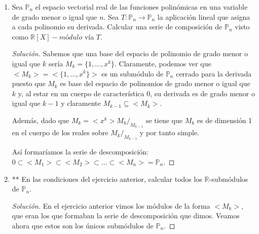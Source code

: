 \documentclass[paper=a4, fontsize=11pt, spanish]{scrartcl}
\begin{document}
\begin{enumerate}
\begin{proof}[Solución]
\begin{itemize}
				$$T = \begin{pmatrix}
					1 & 0 & 0 \\
					0 & 0 & 1 \\
					0 & -1 & 0
				\end{pmatrix}$$
				
				Claramente, el subespacio generado por el eje queda fijo por esta acción, así que se tiene que
				$N = <(0, 1, 0), (0, 0, 1)>$.
				
				\item \textbf{Longitud 3:} $0 \subseteq N_1 \subseteq N_2 \subseteq \mathbb{R}^3$
				
				Este caso es el más fácil de todos pues nos baste con tomar $T = I_3$ para tener la descomposicón
				$0 \subseteq <(1, 0, 0)> \subseteq <(1, 0, 0), (0, 1, 0)> \subseteq \mathbb{R}^3$.
			\end{itemize}
		\end{proof}
		
		\item Sea $\mathbb{P}_n$ el espacio vectorial real de las funciones polinómicas en una variable de grado
		menor o igual que $n$. Sea $T: \mathbb{P}_n \rightarrow \mathbb{P}_n$ la aplicación lineal que asigna a
		cada polinomio su derivada. Calcular una serie de composición de $\mathbb{P}_n$ visto como $\mathbb{R}[X]
		-módulo$ vía $T$.
		\begin{proof}[Solución]
			Sabemos que una base del espacio de polinomio de grado menor o igual que $k$ sería $M_k = \{1, \dots,
			x^k\}$. Claramente, podemos ver que $<M_k> = <\{1, \dots, x^k\}>$ es un submódulo de $\mathbb{P}_n$
			cerrado para la derivada puesto que $M_k$ es base del espacio de polinomios de grado menor o igual
			que $k$ y, al estar en un cuerpo de característica 0, su derivada es de grado menor o igual que $k-1$
			y claramente $M_{k-1} \subseteq <M_k>$.
			
			Además, dado que $M_k = <x^k> M_k/_{M_{k-1}}$ se tiene que $M_k$ es de dimensión 1 en el cuerpo de
			los reales sobre $M_k/_{M_{k-1}}$ y por tanto simple.
			
			Así formaríamos la serie de descomposición: $0 \subset <M_1> \subset <M_2> \subset \dots \subset
			<M_n> = \mathbb{P}_n$.
		\end{proof}
		
		\item ** En las condiciones del ejercicio anterior, calcular todos los $\mathbb{R}$-submódulos de
		$\mathbb{P}_n$.
		\begin{proof}[Solución]
			En el ejercicio anterior vimos los módulos de la forma $<M_k>$, que eran los que formaban la serie
			de descomposición que dimos. Veamos ahora que estos son los únicos submódulos de $\mathbb{P}_n$.
			

\end{proof}
\end{enumerate}
\end{document}
